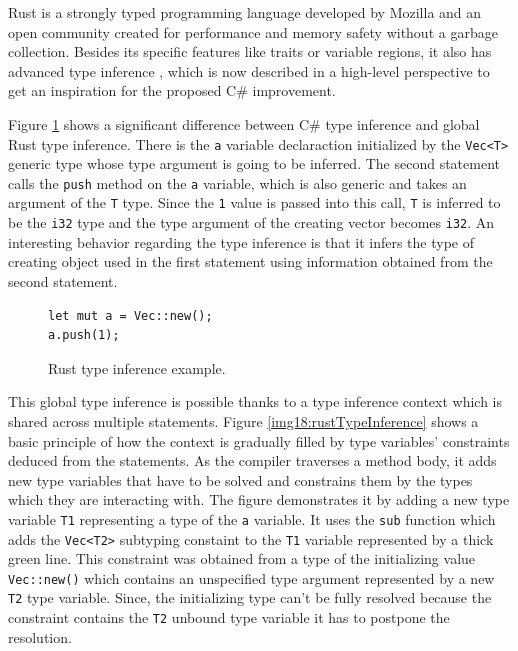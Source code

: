 Rust is a strongly typed programming language developed by Mozilla and an open community created for performance and memory safety without a garbage collection. 
Besides its specific features like traits or variable regions, it also has advanced type inference \cite{online:rustTypeInference}, which is now described in a high-level perspective to get an inspiration for the proposed C\# improvement.
\par
Figure \ref{img17:rustCodeExample} shows a significant difference between C\# type inference and global Rust type inference.
There is the \texttt{a} variable declaraction initialized by the \texttt{Vec<T>} generic type whose type argument is going to be inferred.
The second statement calls the \texttt{push} method on the \texttt{a} variable, which is also generic and takes an argument of the \texttt{T} type.
Since the \texttt{1} value is passed into this call, \texttt{T} is inferred to be the \texttt{i32} type and the type argument of the creating vector becomes \texttt{i32}.
An interesting behavior regarding the type inference is that it infers the type of creating object used in the first statement using information obtained from the second statement.
\begin{figure}[h]
\begin{lstlisting}
let mut a = Vec::new();
a.push(1);
\end{lstlisting}
\caption{Rust type inference example.}
\label{img17:rustCodeExample}
\end{figure}
\par
This global type inference is possible thanks to a type inference context which is shared across multiple statements. 
Figure \ref{img18:rustTypeInference} shows a basic principle of how the context is gradually filled by type variables' constraints deduced from the statements.   
As the compiler traverses a method body, it adds new type variables that have to be solved and constrains them by the types which they are interacting with. 
The figure demonstrates it by adding a new type variable \texttt{T1} representing a type of the \texttt{a} variable.
It uses the \texttt{sub} function which adds the \texttt{Vec<T2>} subtyping constaint to the \texttt{T1} variable represented by a thick green line.
This constraint was obtained from a type of the initializing value \texttt{Vec::new()} which contains an unspecified type argument represented by a new \texttt{T2} type variable.
Since, the initializing type can't be fully resolved because the constraint contains the \texttt{T2} unbound type variable it has to postpone the resolution.
